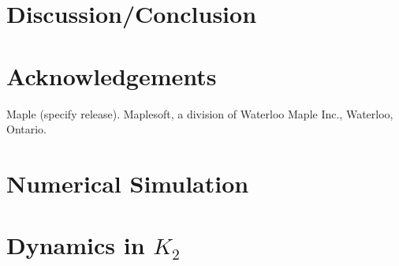 \documentclass{article}
\begin{document}
\section{Discussion/Conclusion}

\section{Acknowledgements}
Maple (specify release). Maplesoft, a division of Waterloo Maple Inc., Waterloo, Ontario.
\newpage


\nocite{strogatz2007nonlinear}

\newpage
\appendix
%
%
%
\section{Numerical Simulation}\label{app:NumSim}

\section{Dynamics in \texorpdfstring{$K_2$}{K2}}
\end{document}
